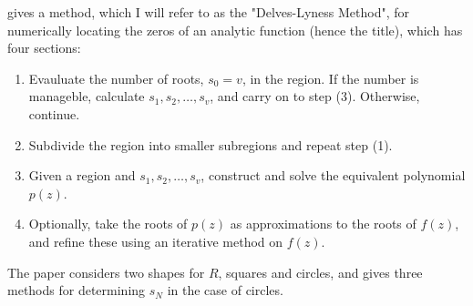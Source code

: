 \documentclass{article}
\begin{document}
\cite{delves1967numerical} gives a method, which I will refer to as the "Delves-Lyness Method", for numerically locating the zeros of an analytic function (hence the title),
which has four sections:
\begin{enumerate}
	\item Evauluate the number of roots, $s_0=v$, in the region.
	If the number is manageble, calculate $s_1,s_2,\dots,s_v$, and carry on to step (3).
	Otherwise, continue.
	\item
	Subdivide the region into smaller subregions and repeat step (1).
	\item Given a region and $s_1,s_2,\dots,s_v$, construct and solve the equivalent polynomial $p(z)$.
	\item Optionally, take the roots of $p(z)$ as approximations to the roots of $f(z)$,
	and refine these using an iterative method on $f(z)$.
\end{enumerate}
The paper considers two shapes for $R$, squares and circles, 
and  gives three methods for determining $s_N$ in the case of circles.

\printbibliography
\end{document}
